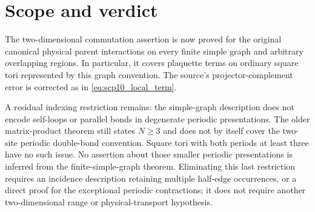 \documentclass{article}
\begin{document}
\section{Scope and verdict}
The two-dimensional commutation assertion is now proved for the original
canonical physical parent interactions on every finite simple graph and
arbitrary overlapping regions. In particular, it covers plaquette terms on
ordinary square tori represented by this graph convention. The source's
projector-complement error is corrected as in
\eqref{eq:scp10_local_term}.

A residual indexing restriction remains: the simple-graph description does
not encode self-loops or parallel bonds in degenerate periodic presentations.
The older matrix-product theorem still states $N\geq3$ and does not by itself
cover the two-site periodic double-bond convention. Square tori with both
periods at least three have no such issue. No assertion about those smaller
periodic presentations is inferred from the finite-simple-graph theorem.
Eliminating this last restriction requires an incidence description retaining
multiple half-edge occurrences, or a direct proof for the exceptional
periodic contractions; it does not require another two-dimensional range or
physical-transport hypothesis.



\end{document}
